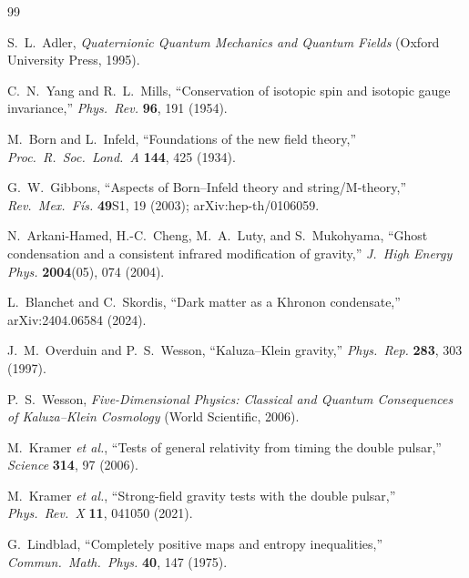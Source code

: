\documentclass[letterpaper,twocolumn,superscriptaddress,longbibliography]{revtex4-2}
\begin{document}
\begin{thebibliography}{99}

S.~L.~Adler,
\textit{Quaternionic Quantum Mechanics and Quantum Fields}
(Oxford University Press, 1995).


C.~N.~Yang and R.~L.~Mills,
``Conservation of isotopic spin and isotopic gauge
invariance,''
\textit{Phys.\ Rev.} \textbf{96}, 191 (1954).


M.~Born and L.~Infeld,
``Foundations of the new field theory,''
\textit{Proc.\ R.\ Soc.\ Lond.\ A} \textbf{144}, 425 (1934).

G.~W.~Gibbons,
``Aspects of Born--Infeld theory and string/M-theory,''
\textit{Rev.\ Mex.\ F\'{i}s.} \textbf{49}S1, 19 (2003);
arXiv:hep-th/0106059.


N.~Arkani-Hamed, H.-C.~Cheng, M.~A.~Luty, and S.~Mukohyama,
``Ghost condensation and a consistent infrared modification
of gravity,''
\textit{J.\ High Energy Phys.} \textbf{2004}(05), 074 (2004).

L.~Blanchet and C.~Skordis,
``Dark matter as a Khronon condensate,''
arXiv:2404.06584 (2024).


J.~M.~Overduin and P.~S.~Wesson,
``Kaluza--Klein gravity,''
\textit{Phys.\ Rep.} \textbf{283}, 303 (1997).

P.~S.~Wesson,
\textit{Five-Dimensional Physics: Classical and Quantum
Consequences of Kaluza--Klein Cosmology}
(World Scientific, 2006).


M.~Kramer \textit{et al.},
``Tests of general relativity from timing the double pulsar,''
\textit{Science} \textbf{314}, 97 (2006).

M.~Kramer \textit{et al.},
``Strong-field gravity tests with the double pulsar,''
\textit{Phys.\ Rev.\ X} \textbf{11}, 041050 (2021).


G.~Lindblad,
``Completely positive maps and entropy inequalities,''
\textit{Commun.\ Math.\ Phys.} \textbf{40}, 147 (1975).

\end{thebibliography}
\end{document}
